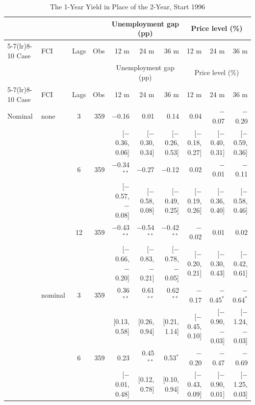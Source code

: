 \begingroup\scriptsize\setlength{\tabcolsep}{0.9pt}
\begin{longtable}{llcrrrrrrr}
\caption{The 1-Year Yield in Place of the 2-Year, Start 1996}\label{tab:appR9}\\
\toprule
 & & & & \multicolumn{3}{c}{Unemployment gap (pp)} & \multicolumn{3}{c}{Price level (\%)}\\ \cmidrule(lr){5-7}\cmidrule(lr){8-10}
Case & FCI & Lags & Obs & 12 m & 24 m & 36 m & 12 m & 24 m & 36 m\\
\midrule\endfirsthead
\toprule
 & & & & \multicolumn{3}{c}{Unemployment gap (pp)} & \multicolumn{3}{c}{Price level (\%)}\\ \cmidrule(lr){5-7}\cmidrule(lr){8-10}
Case & FCI & Lags & Obs & 12 m & 24 m & 36 m & 12 m & 24 m & 36 m\\
\midrule\endhead
\bottomrule\endfoot
Nominal & none & 3 & 359 & $-$0.16 & 0.01 & 0.14 & 0.04 & $-$0.07 & $-$0.20\\
 & & & & {\scriptsize [$-$0.36, 0.06]} & {\scriptsize [$-$0.30, 0.34]} & {\scriptsize [$-$0.26, 0.53]} & {\scriptsize [$-$0.18, 0.27]} & {\scriptsize [$-$0.40, 0.31]} & {\scriptsize [$-$0.59, 0.36]}\\
 &  & 6 & 359 & $-$0.34$^{**}$ & $-$0.27 & $-$0.12 & 0.02 & $-$0.01 & $-$0.11\\
 & & & & {\scriptsize [$-$0.57, $-$0.08]} & {\scriptsize [$-$0.58, 0.08]} & {\scriptsize [$-$0.49, 0.25]} & {\scriptsize [$-$0.19, 0.26]} & {\scriptsize [$-$0.36, 0.40]} & {\scriptsize [$-$0.58, 0.46]}\\
 &  & 12 & 359 & $-$0.43$^{**}$ & $-$0.54$^{**}$ & $-$0.42$^{**}$ & $-$0.02 & 0.01 & 0.02\\
 & & & & {\scriptsize [$-$0.66, $-$0.20]} & {\scriptsize [$-$0.83, $-$0.21]} & {\scriptsize [$-$0.78, $-$0.05]} & {\scriptsize [$-$0.20, 0.21]} & {\scriptsize [$-$0.30, 0.43]} & {\scriptsize [$-$0.42, 0.61]}\\
 & nominal & 3 & 359 & 0.36$^{**}$ & 0.61$^{**}$ & 0.62$^{**}$ & $-$0.17 & $-$0.45$^{*}$ & $-$0.64$^{*}$\\
 & & & & {\scriptsize [0.13, 0.58]} & {\scriptsize [0.26, 0.94]} & {\scriptsize [0.21, 1.14]} & {\scriptsize [$-$0.45, 0.10]} & {\scriptsize [$-$0.90, $-$0.03]} & {\scriptsize [$-$1.24, $-$0.03]}\\
 &  & 6 & 359 & 0.23 & 0.45$^{**}$ & 0.53$^{*}$ & $-$0.20 & $-$0.47 & $-$0.69\\
 & & & & {\scriptsize [$-$0.01, 0.48]} & {\scriptsize [0.12, 0.78]} & {\scriptsize [0.10, 0.94]} & {\scriptsize [$-$0.43, 0.09]} & {\scriptsize [$-$0.90, 0.01]} & {\scriptsize [$-$1.25, 0.03]}\\

\end{longtable}
